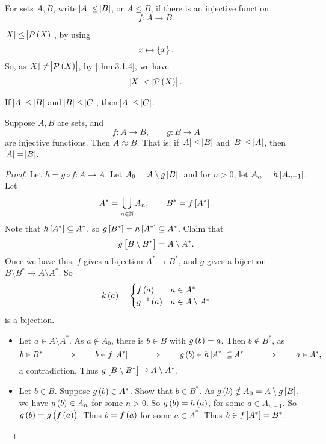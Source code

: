 
\begin{definition}
For sets $ A, B $, write $ \abs{A} \le \abs{B} $, or $ A \le B $, if there is an injective function
$$ f : A \to B. $$
\end{definition}

\begin{note*}
$ \abs{X} \le \abs{\PP\br{X}} $, by using
$$ x \mapsto \cbr{x}. $$
So, as $ \abs{X} \ne \abs{\PP\br{X}} $, by \ref{thm:3.1.4}, we have
$$ \abs{X} < \abs{\PP\br{X}}. $$
\end{note*}

\begin{example*}
If $ \abs{A} \le \abs{B} $ and $ \abs{B} \le \abs{C} $, then $ \abs{A} \le \abs{C} $.
\end{example*}

\begin{theorem}
\label{thm:3.1.6}
Suppose $ A, B $ are sets, and
$$ f : A \to B, \qquad g : B \to A $$
are injective functions. Then $ A \approx B $. That is, if $ \abs{A} \le \abs{B} $ and $ \abs{B} \le \abs{A} $, then $ \abs{A} = \abs{B} $.
\end{theorem}

\pagebreak

\begin{proof}
Let $ h = g \circ f : A \to A $. Let $ A_0 = A \setminus g\sbr{B} $, and for $ n > 0 $, let $ A_n = h\sbr{A_{n - 1}} $. Let
$$ A^* = \bigcup_{n \in \N} A_n, \qquad B^* = f\sbr{A^*}. $$
Note that $ h\sbr{A^*} \subseteq A^* $, so $ g\sbr{B^*} = h\sbr{A^*} \subseteq A^* $. Claim that
$$ g\sbr{B \setminus B^*} = A \setminus A^*. $$
Once we have this, $ f $ gives a bijection $ A^* \to B^* $, and $ g $ gives a bijection $ B \setminus B^* \to A \setminus A^* $. So
$$ k\br{a} =
\begin{cases}
f\br{a} & a \in A^* \\
g^{-1}\br{a} & a \in A \setminus A^*
\end{cases}
$$
is a bijection.
\begin{itemize}
\item Let $ a \in A \setminus A^* $. As $ a \notin A_0 $, there is $ b \in B $ with $ g\br{b} = a $. Then $ b \notin B^* $, as
$$ b \in B^* \qquad \implies \qquad b \in f\sbr{A^*} \qquad \implies \qquad g\br{b} \in h\sbr{A^*} \subseteq A^* \qquad \implies \qquad a \in A^*, $$
a contradiction. Thus $ g\sbr{B \setminus B^*} \supseteq A \setminus A^* $.
\item Let $ b \in B $. Suppose $ g\br{b} \in A^* $. Show that $ b \in B^* $. As $ g\br{b} \notin A_0 = A \setminus g\sbr{B} $, we have $ g\br{b} \in A_n $ for some $ n > 0 $. So $ g\br{b} = h\br{a} $, for some $ a \in A_{n - 1} $. So $ g\br{b} = g\br{f\br{a}} $. Thus $ b = f\br{a} $ for some $ a \in A^* $. Thus $ b \in f\sbr{A^*} = B^* $.
\end{itemize}
\end{proof}

